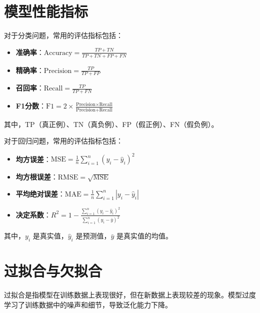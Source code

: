 \section{模型性能指标}

\begin{definition}[分类问题的评估指标]
    对于分类问题，常用的评估指标包括：
    \begin{itemize}
        \item \textbf{准确率}：$\text{Accuracy} = \frac{TP + TN}{TP + TN + FP + FN}$
        \item \textbf{精确率}：$\text{Precision} = \frac{TP}{TP + FP}$
        \item \textbf{召回率}：$\text{Recall} = \frac{TP}{TP + FN}$
        \item \textbf{F1分数}：$\text{F1} = 2 \times \frac{\text{Precision} \times \text{Recall}}{\text{Precision} + \text{Recall}}$
    \end{itemize}
    其中，TP（真正例）、TN（真负例）、FP（假正例）、FN（假负例）。
\end{definition}

\begin{definition}[回归问题的评估指标]
    对于回归问题，常用的评估指标包括：
    \begin{itemize}
        \item \textbf{均方误差}：$\text{MSE} = \frac{1}{n}\sum_{i=1}^{n}(y_i - \hat{y}_i)^2$
        \item \textbf{均方根误差}：$\text{RMSE} = \sqrt{\text{MSE}}$
        \item \textbf{平均绝对误差}：$\text{MAE} = \frac{1}{n}\sum_{i=1}^{n}|y_i - \hat{y}_i|$
        \item \textbf{决定系数}：$R^2 = 1 - \frac{\sum_{i=1}^{n}(y_i - \hat{y}_i)^2}{\sum_{i=1}^{n}(y_i - \bar{y})^2}$
    \end{itemize}
    其中，$y_i$ 是真实值，$\hat{y}_i$ 是预测值，$\bar{y}$ 是真实值的均值。
\end{definition}

\section{过拟合与欠拟合}

\begin{definition}[过拟合]
    过拟合是指模型在训练数据上表现很好，但在新数据上表现较差的现象。模型过度学习了训练数据中的噪声和细节，导致泛化能力下降。
\end{definition}

